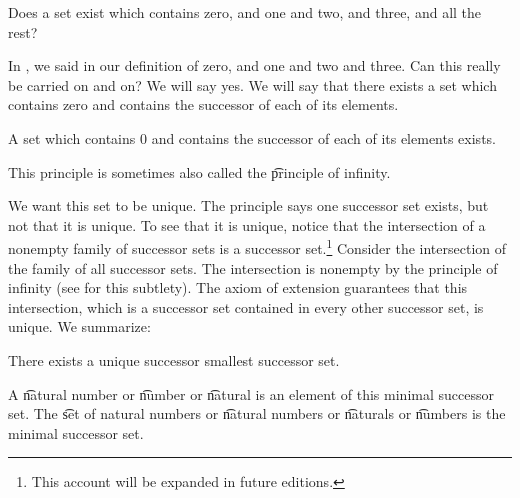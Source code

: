 

Does a set exist which contains zero, and one and two, and three, and all the rest?


In ,
we said  in our definition of zero, and one and two and three.
Can this really be carried on and on?
We will say yes.
We will say that there exists a set which contains zero and contains the successor of each of its elements.

\begin{principle}
  A set which contains 0 and contains the successor of each of its elements exists.
\end{principle}

This principle is sometimes also called the \t{principle of infinity}.

We want this set to be unique.
The principle says one successor set exists, but not that it is unique.
To see that it is unique, notice that the intersection of a nonempty family of successor sets is a successor set.\footnote{This account will be expanded in future editions.}
Consider the intersection of the family of all successor sets.
The intersection is nonempty by the principle of infinity (see  for this subtlety).
The axiom of extension guarantees that this intersection, which is a successor set contained in every other successor set, is unique.
We summarize:

\begin{proposition}
  There exists a unique successor smallest successor set.
  \label{natural_numbers:proposition:omega}
\end{proposition}

A \t{natural number} or \t{number} or \t{natural} is an element of this minimal successor set.
The \t{set of natural numbers} or \t{natural numbers} or \t{naturals} or \t{numbers} is the minimal successor set.


